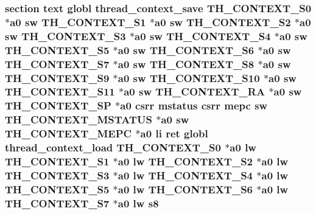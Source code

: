 \hypertarget{riscv_2kpanica_8S_a266c8c7d92128f0351b0b2a485d3534a}{
\subsubsection[{s8}]{\setlength{\rightskip}{0pt plus 5cm}section text globl {\bf thread\-\_\-context\-\_\-save} {\bf T\-H\-\_\-\-C\-O\-N\-T\-E\-X\-T\-\_\-\-S0} $\ast${\bf a0} {\bf sw} {\bf T\-H\-\_\-\-C\-O\-N\-T\-E\-X\-T\-\_\-\-S1} $\ast${\bf a0} {\bf sw} {\bf T\-H\-\_\-\-C\-O\-N\-T\-E\-X\-T\-\_\-\-S2} $\ast${\bf a0} {\bf sw} {\bf T\-H\-\_\-\-C\-O\-N\-T\-E\-X\-T\-\_\-\-S3} $\ast${\bf a0} {\bf sw} {\bf T\-H\-\_\-\-C\-O\-N\-T\-E\-X\-T\-\_\-\-S4} $\ast${\bf a0} {\bf sw} {\bf T\-H\-\_\-\-C\-O\-N\-T\-E\-X\-T\-\_\-\-S5} $\ast${\bf a0} {\bf sw} {\bf T\-H\-\_\-\-C\-O\-N\-T\-E\-X\-T\-\_\-\-S6} $\ast${\bf a0} {\bf sw} {\bf T\-H\-\_\-\-C\-O\-N\-T\-E\-X\-T\-\_\-\-S7} $\ast${\bf a0} {\bf sw} {\bf T\-H\-\_\-\-C\-O\-N\-T\-E\-X\-T\-\_\-\-S8} $\ast${\bf a0} {\bf sw} {\bf T\-H\-\_\-\-C\-O\-N\-T\-E\-X\-T\-\_\-\-S9} $\ast${\bf a0} {\bf sw} {\bf T\-H\-\_\-\-C\-O\-N\-T\-E\-X\-T\-\_\-\-S10} $\ast${\bf a0} {\bf sw} {\bf T\-H\-\_\-\-C\-O\-N\-T\-E\-X\-T\-\_\-\-S11} $\ast${\bf a0} {\bf sw} {\bf T\-H\-\_\-\-C\-O\-N\-T\-E\-X\-T\-\_\-\-R\-A} $\ast${\bf a0} {\bf sw} {\bf T\-H\-\_\-\-C\-O\-N\-T\-E\-X\-T\-\_\-\-S\-P} $\ast${\bf a0} csrr {\bf mstatus} csrr {\bf mepc} {\bf sw} {\bf T\-H\-\_\-\-C\-O\-N\-T\-E\-X\-T\-\_\-\-M\-S\-T\-A\-T\-U\-S} $\ast${\bf a0} {\bf sw} {\bf T\-H\-\_\-\-C\-O\-N\-T\-E\-X\-T\-\_\-\-M\-E\-P\-C} $\ast${\bf a0} {\bf li} ret globl {\bf thread\-\_\-context\-\_\-load} {\bf T\-H\-\_\-\-C\-O\-N\-T\-E\-X\-T\-\_\-\-S0} $\ast${\bf a0} {\bf lw} {\bf T\-H\-\_\-\-C\-O\-N\-T\-E\-X\-T\-\_\-\-S1} $\ast${\bf a0} {\bf lw} {\bf T\-H\-\_\-\-C\-O\-N\-T\-E\-X\-T\-\_\-\-S2} $\ast${\bf a0} {\bf lw} {\bf T\-H\-\_\-\-C\-O\-N\-T\-E\-X\-T\-\_\-\-S3} $\ast${\bf a0} {\bf lw} {\bf T\-H\-\_\-\-C\-O\-N\-T\-E\-X\-T\-\_\-\-S4} $\ast${\bf a0} {\bf lw} {\bf T\-H\-\_\-\-C\-O\-N\-T\-E\-X\-T\-\_\-\-S5} $\ast${\bf a0} {\bf lw} {\bf T\-H\-\_\-\-C\-O\-N\-T\-E\-X\-T\-\_\-\-S6} $\ast${\bf a0} {\bf lw} {\bf T\-H\-\_\-\-C\-O\-N\-T\-E\-X\-T\-\_\-\-S7} $\ast${\bf a0} {\bf lw} s8}}\label{riscv_2kpanica_8S_a266c8c7d92128f0351b0b2a485d3534a}
